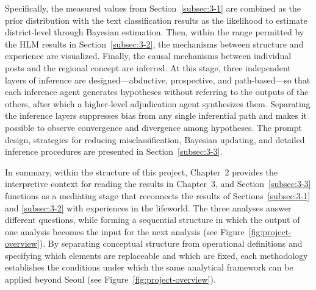 Specifically, the measured \umc{} values from Section~\ref{subsec:3-1} are combined as the prior distribution with the text classification results as the likelihood to estimate district-level \umc{} through Bayesian estimation. Then, within the range permitted by the HLM results in Section~\ref{subsec:3-2}, the mechanisms between structure and experience are visualized. Finally, the causal mechanisms between individual posts and the regional \umc{} concept are inferred. At this stage, three independent layers of inference are designed---abductive, prospective, and path-based---so that each inference agent generates hypotheses without referring to the outputs of the others, after which a higher-level adjudication agent synthesizes them. Separating the inference layers suppresses bias from any single inferential path and makes it possible to observe convergence and divergence among hypotheses. The prompt design, strategies for reducing misclassification, Bayesian updating, and detailed inference procedures are presented in Section~\ref{subsec:3-3}.

In summary, within the structure of this project, Chapter~2 provides the interpretive context for reading the results in Chapter~3, and Section~\ref{subsec:3-3} functions as a mediating stage that reconnects the results of Sections~\ref{subsec:3-1} and \ref{subsec:3-2} with experiences in the lifeworld. The three analyses answer different questions, while forming a sequential structure in which the output of one analysis becomes the input for the next analysis (see Figure~\ref{fig:project-overview}). By separating conceptual structure from operational definitions and specifying which elements are replaceable and which are fixed, each methodology establishes the conditions under which the same analytical framework can be applied beyond Seoul (see Figure~\ref{fig:project-overview}).

